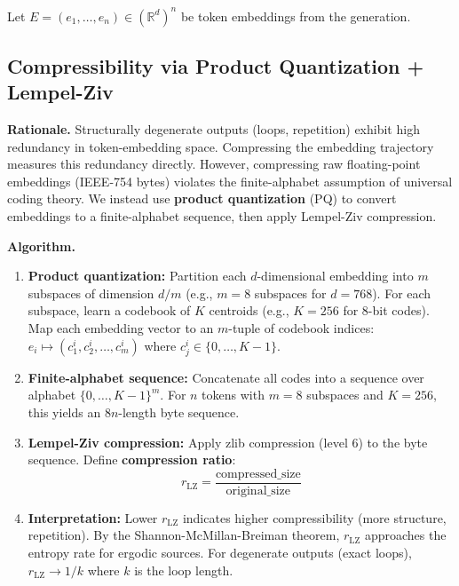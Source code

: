 \documentclass[11pt]{article}
\begin{document}
Let $E=(e_1,\dots,e_n)\in(\mathbb{R}^d)^n$ be token embeddings from the generation.

\subsection{Compressibility via Product Quantization + Lempel-Ziv}
\label{sec:signal-rlz}

\textbf{Rationale.} Structurally degenerate outputs (loops, repetition) exhibit high redundancy in token-embedding space. Compressing the embedding trajectory measures this redundancy directly. However, compressing raw floating-point embeddings (IEEE-754 bytes) violates the finite-alphabet assumption of universal coding theory. We instead use \textbf{product quantization} (PQ) to convert embeddings to a finite-alphabet sequence, then apply Lempel-Ziv compression.

\textbf{Algorithm.}
\begin{enumerate}
\item \textbf{Product quantization:} Partition each $d$-dimensional embedding into $m$ subspaces of dimension $d/m$ (e.g., $m=8$ subspaces for $d=768$). For each subspace, learn a codebook of $K$ centroids (e.g., $K=256$ for 8-bit codes). Map each embedding vector to an $m$-tuple of codebook indices: $e_i \mapsto (c_1^i, c_2^i, \dots, c_m^i)$ where $c_j^i \in \{0,\dots,K-1\}$.

\item \textbf{Finite-alphabet sequence:} Concatenate all codes into a sequence over alphabet $\{0,\dots,K-1\}^m$. For $n$ tokens with $m=8$ subspaces and $K=256$, this yields an 8$n$-length byte sequence.

\item \textbf{Lempel-Ziv compression:} Apply zlib compression (level 6) to the byte sequence. Define \textbf{compression ratio}:
\begin{equation}
r_{\text{LZ}} = \frac{\text{compressed\_size}}{\text{original\_size}}
\end{equation}

\item \textbf{Interpretation:} Lower $r_{\text{LZ}}$ indicates higher compressibility (more structure, repetition). By the Shannon-McMillan-Breiman theorem, $r_{\text{LZ}}$ approaches the entropy rate for ergodic sources. For degenerate outputs (exact loops), $r_{\text{LZ}} \rightarrow 1/k$ where $k$ is the loop length.
\end{enumerate}
\end{document}
